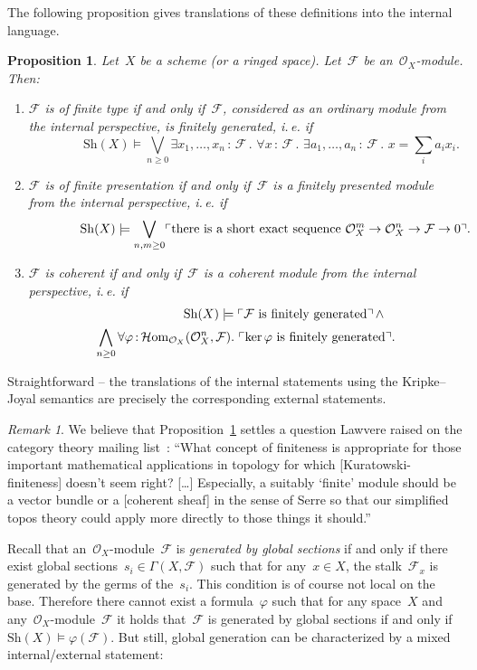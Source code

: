 \documentclass[10pt,reqno,a4paper]{amsbook}
\makeatletter
\theoremstyle{definition}
\theoremstyle{plain}
\newtheorem{prop}[defn]{Proposition}
\theoremstyle{remark}
\newtheorem{rem}[defn]{Remark}
\newcommand{\F}{\mathcal{F}}
\renewcommand{\O}{\mathcal{O}}
\newcommand{\HOM}{\mathcal{H}\mathrm{om}}
\newcommand{\Sh}{\mathrm{Sh}}
\DeclareMathOperator{\Kernel}{ker}
\newcommand{\?}{\,{:}\,}
\renewcommand{\_}{\mathpunct{.}\,}
\newcommand{\speak}[1]{\ulcorner\text{\textnormal{#1}}\urcorner}
\newcommand{\ie}{i.\,e.\@\xspace}
\renewenvironment{proof}[1][\proofname]{\par
  \pushQED{\qed}%
  \normalfont \topsep6\p@\@plus6\p@\relax
  \trivlist
  \item[\hskip\labelsep
        \itshape
    #1\@addpunct{.}]\ignorespaces
}{%
  \popQED\endtrivlist\@endpefalse
}
\makeatother
\begin{document}
The following proposition gives translations of these definitions into the
internal language.
\begin{prop}\label{prop:finite-type-and-co}
Let~$X$ be a scheme (or a ringed space). Let~$\F$ be
an~$\O_X$-module. Then:
\begin{enumerate}
\item $\F$ is of finite type if and only if~$\F$, considered as an ordinary
module from the internal perspective, is finitely generated, \ie if
\[ {\qquad\qquad} \Sh(X) \models
  \bigvee_{n \geq 0}
  \exists x_1,\ldots,x_n\?\F\_
  \forall x\?\F\_
  \exists a_1,\ldots,a_n\?\F\_
  x = \textstyle\sum\limits_i a_i x_i. \]
\item $\F$ is of finite presentation if and only if~$\F$ is a finitely
presented module from the internal perspective, \ie if
\[ {\qquad\qquad} \Sh(X) \models \bigvee_{n,m \geq 0}
  \speak{there is a short exact sequence $\O_X^m \to \O_X^n \to \F \to 0$}.
  \]
\item $\F$ is coherent if and only if~$\F$ is a coherent module from the
internal perspective, \ie if
\begin{multline*}
{\qquad\qquad\qquad}
  \Sh(X) \models \speak{$\F$ is finitely generated} \mathop{\wedge} \\
  \bigwedge_{n \geq 0} \forall \varphi \? \HOM_{\O_X}(\O_X^n,\F)\_
  \speak{$\Kernel \varphi$ is finitely generated}.
\end{multline*}
\end{enumerate}
\end{prop}
\begin{proof}Straightforward -- the translations of the internal statements using
the Kripke--Joyal semantics are precisely the corresponding external
statements.
\end{proof}

\begin{rem}We believe that Proposition~\ref{prop:finite-type-and-co} settles a
question Lawvere raised on the category theory mailing
list~\cite{lawvere:finiteness-question}: ``What concept of finiteness is
appropriate for those important mathematical applications in topology for which
[Kuratowski-finiteness] doesn't seem right? [\ldots\!] Especially, a suitably
`finite' module should be a vector bundle or a [coherent sheaf] in the sense of
Serre so that our simplified topos theory could apply more directly to those
things it should.''
\end{rem}

Recall that an~$\O_X$-module~$\F$ is \emph{generated by global sections} if and
only if there exist global sections~$s_i \in \Gamma(X,\F)$ such that for any~$x
\in X$, the stalk~$\F_x$ is generated by the germs of the~$s_i$.
This condition is of course not local on the base. Therefore there cannot
exist a formula~$\varphi$ such that for any space~$X$ and
any~$\O_X$-module~$\F$ it holds that~$\F$ is generated by global sections if
and only if~$\Sh(X) \models \varphi(\F)$. But still, global generation can be
characterized by a mixed internal/external statement:
\end{document}
